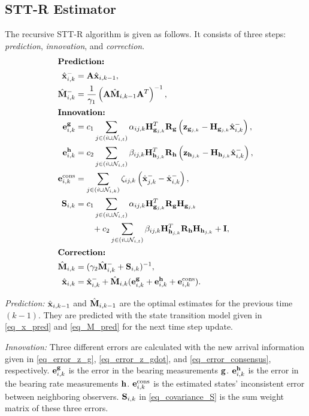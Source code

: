\documentclass[letterpaper, 10 pt, conference]{ieeeconf}  %
\begin{document}
\subsection{STT-R Estimator}

The recursive STT-R algorithm is given as follows. It consists of three steps: \emph{prediction}, \emph{innovation}, and \emph{correction}.
\begin{align}	
\intertext{\textbf{Prediction:}}
\hat{\x}^{-}_{i,k} & = \A\hat{\x}_{i,k-1}, \label{eq_x_pred}\\
\hat{\M}^{-}_{i,k} & = \frac{1}{\gamma_1}\left(\A\hat{\M}_{i,k-1}\A^T\right)^{-1}, \label{eq_M_pred}\\
\intertext{\textbf{Innovation:}}
\mathbf{e}^{\g}_{i,k} & = c_1 \sum_{j\in(i\cup\N_{i,t})} \alpha_{ij, k} \H_{\g_{j, k}}^T\R_{\g}\left(\z_{\g_{j, k}} - \H_{\g_{j, k}}\hat{\x}_{i,k}^{-} \right), \label{eq_error_z_g}\\
\mathbf{e}^{\h}_{i,k} & =c_2 \sum_{j\in(i\cup\N_{i,t})} \beta_{ij, k} \H_{\h_{j, k}}^T\R_{\h}\left(\z_{\h_{j, k}} - \H_{\h_{j, k}}\hat{\x}_{i,k}^{-} \right), \label{eq_error_z_gdot}\\	
\mathbf{e}^{\text{cons}}_{i,k} & = \sum_{j\in(i\cup\N_{i,k})} \zeta_{ij, k} \left(\hat{\x}_{j, k}^{-} - \hat{\x}_{i,k}^{-} \right), \label{eq_error_consensus}\\	
\S_{i,k} & =c_1\sum_{j\in(i\cup\N_{i,t})}\alpha_{ij, k}\H_{\g_{j, k}}^T\R_{\g}\H_{\g_{j, k}} \nonumber\\
& \qquad + c_2\sum_{j\in(i\cup\N_{i,t})}\beta_{ij, k}\H_{\h_{j, k}}^T\R_{\h}\H_{\h_{j, k}}+ \I , \label{eq_covariance_S}\\
\intertext{\textbf{Correction:}}
\hat{\M}_{i,k} & = (\gamma_2\hat{\M}_{i,k}^{-}+ \S_{i,k})^{-1}, \label{eq_M_correction}\\
\hat{\x}_{i,k} & = \hat{\x}_{i,k}^{-} + \hat{\M}_{i,k} (\mathbf{e}^{\g}_{i,k} + \mathbf{e}^{\h}_{i,k}+\mathbf{e}^{\text{cons}}_{i,k}).\label{eq_x_correction}
\end{align}

\emph{Prediction:}
$\hat{\x}_{i,k-1}$ and $\hat{\M}_{i,k-1}$ are the optimal estimates for the previous time $(k-1)$. They are predicted with the state transition model given in \eqref{eq_x_pred} and \eqref{eq_M_pred} for the next time step update.

\emph{Innovation:} Three different errors are calculated with the new arrival information given in \eqref{eq_error_z_g}, \eqref{eq_error_z_gdot}, and \eqref{eq_error_consensus}, respectively. $\mathbf{e}^{\g}_{i,k}$ is the error in the bearing measurements $\g$. $\mathbf{e}^{\h}_{i,k}$ is the error in the bearing rate measurements $\h$. $\mathbf{e}^{\rm cons}_{i,k}$ is the estimated states' inconsistent error between neighboring observers. $\S_{i,k}$ in \eqref{eq_covariance_S} is the sum weight matrix of these three errors.
\end{document}
